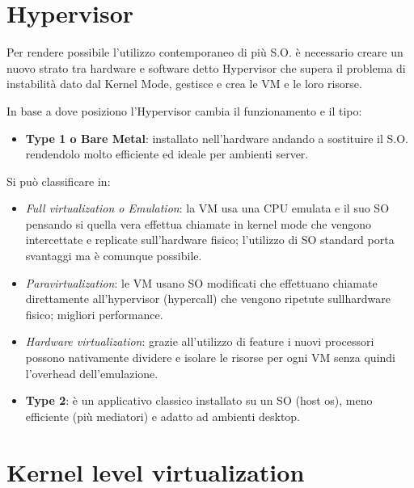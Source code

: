 \section{Hypervisor}\label{hypervisor}

Per rendere possibile l'utilizzo contemporaneo di più S.O. è necessario
creare un nuovo strato tra hardware e software detto Hypervisor che
supera il problema di instabilità dato dal Kernel Mode, gestisce e crea
le VM e le loro risorse.

In base a dove posiziono l'Hypervisor cambia il funzionamento e il tipo:

\begin{itemize}
\item
  \textbf{Type 1 o Bare Metal}: installato nell'hardware andando a
  sostituire il S.O. rendendolo molto efficiente ed ideale per ambienti
  server.
\end{itemize}

Si può classificare in:

\begin{itemize}
\item
  \emph{Full virtualization o Emulation}: la VM usa una CPU emulata e il
  suo SO pensando si quella vera effettua chiamate in kernel mode che
  vengono intercettate e replicate sull'hardware fisico; l'utilizzo di
  SO standard porta svantaggi ma è comunque possibile.
\item
  \emph{Paravirtualization}: le VM usano SO modificati che effettuano
  chiamate direttamente all'hypervisor (hypercall) che vengono ripetute
  sull\textquotesingle hardware fisico; migliori performance.
\item
  \emph{Hardware virtualization}: grazie all'utilizzo di feature i nuovi
  processori possono nativamente dividere e isolare le risorse per ogni
  VM senza quindi l'overhead dell'emulazione.
\end{itemize}

\begin{itemize}
\item
  \textbf{Type 2}: è un applicativo classico installato su un SO (host
  os), meno efficiente (più mediatori) e adatto ad ambienti desktop.
\end{itemize}

\section{Kernel level virtualization}\label{kernel-level-virtualization}

